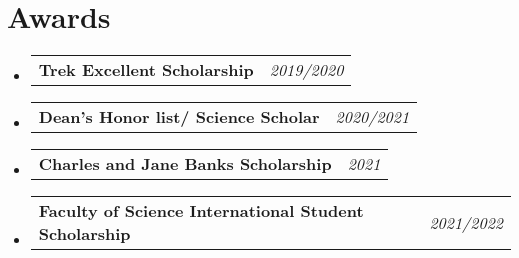 \documentclass[letterpaper,11pt]{article}
\makeatletter
\newcommand{\resumeItem}[2]{
  \item{
    \textbf{#1}{: #2 \vspace{-2pt}}
  }
}
\newcommand{\awardSubItem}[2]{
  \item
    \begin{tabular*}{0.97\textwidth}{@{}l@{\extracolsep{\fill}}r@{}}
      \textbf{ #1} & \textit{ #2} \\
    \end{tabular*}\vspace{-8pt}
}
\newcommand{\resumeSubItem}[2]{\resumeItem{#1}{#2}\vspace{-4pt}}
\newcommand{\resumeSubHeadingListStart}{\begin{itemize}[leftmargin=*]}
\newcommand{\resumeSubHeadingListEnd}{\end{itemize}}
\makeatother
\begin{document}
\section{Awards}
  \resumeSubHeadingListStart
  \awardSubItem{Trek Excellent Scholarship}     {2019/2020}
  \awardSubItem{Dean's Honor list/ Science Scholar} {2020/2021}
  \awardSubItem{Charles and Jane Banks Scholarship}{2021}
  \awardSubItem{Faculty of Science International Student Scholarship}{2021/2022}
  \resumeSubHeadingListEnd



\end{document}
